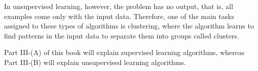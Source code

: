 In unsupervised learning, however, the problem has no output, that is, all examples come only with the input data. Therefore, one of the main tasks assigned to these types of algorithms is clustering, where the algorithm learns to find patterns in the input data to separate them into groups called clusters. 

Part III-(A) of this book will explain supervised learning algorithms, whereas Part III-(B) will explain unsupervised learning algorithms.




%
